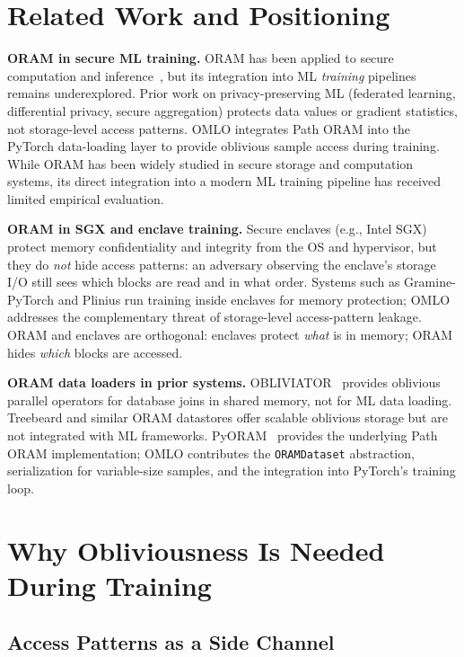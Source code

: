 \documentclass[11pt]{article}
\begin{document}
\section{Related Work and Positioning}
\label{sec:related}

\textbf{ORAM in secure ML training.}
ORAM has been applied to secure computation and inference~\cite{goldreich1996,stefanov2013}, but its integration into ML \emph{training} pipelines remains underexplored.
Prior work on privacy-preserving ML (federated learning, differential privacy, secure aggregation) protects data values or gradient statistics, not storage-level access patterns.
OMLO integrates Path ORAM into the PyTorch data-loading layer to provide oblivious sample access during training.
While ORAM has been widely studied in secure storage and computation systems, its direct integration into a modern ML training pipeline has received limited empirical evaluation.

\textbf{ORAM in SGX and enclave training.}
Secure enclaves (e.g., Intel SGX) protect memory confidentiality and integrity from the OS and hypervisor, but they do \emph{not} hide access patterns: an adversary observing the enclave's storage I/O still sees which blocks are read and in what order.
Systems such as Gramine-PyTorch and Plinius run training inside enclaves for memory protection; OMLO addresses the complementary threat of storage-level access-pattern leakage.
ORAM and enclaves are orthogonal: enclaves protect \emph{what} is in memory; ORAM hides \emph{which} blocks are accessed.

\textbf{ORAM data loaders in prior systems.}
OBLIVIATOR~\cite{mavrogiannakis2025} provides oblivious parallel operators for database joins in shared memory, not for ML data loading.
Treebeard and similar ORAM datastores offer scalable oblivious storage but are not integrated with ML frameworks.
PyORAM~\cite{pyoram} provides the underlying Path ORAM implementation; OMLO contributes the \texttt{ORAMDataset} abstraction, serialization for variable-size samples, and the integration into PyTorch's training loop.

\section{Why Obliviousness Is Needed During Training}
\label{sec:why}

\subsection{Access Patterns as a Side Channel}
\end{document}
